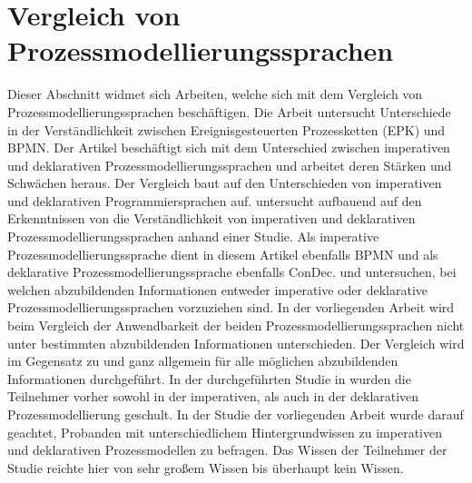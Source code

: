 \section{Vergleich von Prozessmodellierungssprachen}

Dieser Abschnitt widmet sich Arbeiten, welche sich mit dem Vergleich von Prozessmodellierungssprachen beschäftigen.\newline
Die Arbeit \cite{recker2007does} untersucht Unterschiede in der Verständlichkeit zwischen Ereignisgesteuerten Prozessketten (EPK) und BPMN.\newline
Der Artikel \cite{fahland2010} beschäftigt sich mit dem Unterschied zwischen imperativen und deklarativen Prozessmodellierungssprachen und arbeitet deren Stärken und Schwächen heraus. Der Vergleich baut auf den Unterschieden von imperativen und deklarativen Programmiersprachen auf. \newline
\cite{pichler2012} untersucht aufbauend auf den Erkenntnissen von  \cite{fahland2010} die Verständlichkeit von imperativen und deklarativen Prozessmodellierungssprachen anhand einer Studie. Als imperative Prozessmodellierungssprache dient in diesem Artikel ebenfalls BPMN und als deklarative Prozessmodellierungssprache ebenfalls ConDec. \newline 
\cite{fahland2010} und \cite{pichler2012} untersuchen, bei welchen abzubildenden Informationen entweder imperative oder deklarative Prozessmodellierungssprachen vorzuziehen sind. In der vorliegenden Arbeit wird beim Vergleich der Anwendbarkeit der beiden Prozessmodellierungssprachen nicht unter bestimmten abzubildenden Informationen unterschieden. Der Vergleich wird im Gegensatz zu \cite{fahland2010} und \cite{pichler2012}  ganz allgemein für alle möglichen abzubildenden Informationen durchgeführt. \newline
In der durchgeführten Studie in \cite{pichler2012} wurden die Teilnehmer vorher sowohl in der imperativen, als auch in der deklarativen Prozessmodellierung geschult. In der Studie der vorliegenden Arbeit wurde darauf geachtet, Probanden mit unterschiedlichem Hintergrundwissen zu imperativen und deklarativen Prozessmodellen zu befragen. Das Wissen der Teilnehmer der Studie reichte hier von sehr großem Wissen bis überhaupt kein Wissen.\newline


